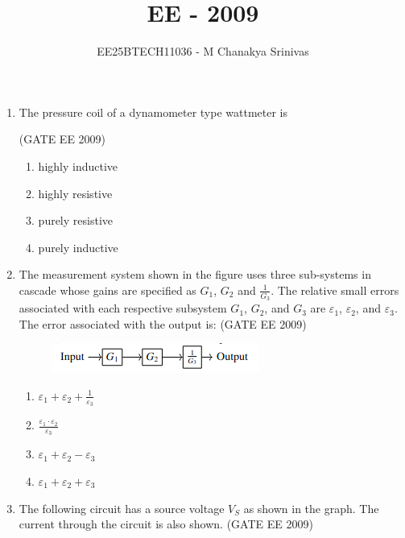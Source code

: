 \documentclass[journal,12pt,onecolumn]{IEEEtran}
\title{\LARGE \textbf{EE - 2009}}
\author{\Large EE25BTECH11036 - M Chanakya Srinivas}
\date{}
\theoremstyle{remark}
\begin{document}
\maketitle
\begin{flushleft}
\begin{enumerate}

\item The pressure coil of a dynamometer type wattmeter is 

\hfill(GATE EE 2009)

\begin{enumerate}
    \item highly inductive  
\item  highly resistive  
\item  purely resistive  
\item purely inductive

\end{enumerate}


\item The measurement system shown in the figure uses three sub-systems in cascade whose gains are specified as $G_1$, $G_2$ and $\frac{1}{G_3}$. The relative small errors associated with each respective subsystem $G_1$, $G_2$, and $G_3$ are $\varepsilon_1$, $\varepsilon_2$, and $\varepsilon_3$. The error associated with the output is: 
\hfill(GATE EE 2009)
\begin{figure}[H]
    \centering
    \includegraphics[width=0.5\columnwidth]{figs/image2.png}
    \caption{}
    \label{fig:placeholder}
\end{figure}

\begin{enumerate}
    \item  $\varepsilon_1 + \varepsilon_2 + \frac{1}{\varepsilon_3}$  
 \item $\frac{\varepsilon_1 \cdot \varepsilon_2}{\varepsilon_3}$  
 \item $\varepsilon_1 + \varepsilon_2 - \varepsilon_3$  
 \item $\varepsilon_1 + \varepsilon_2 + \varepsilon_3$
\end{enumerate}


\item The following circuit has a source voltage $V_S$ as shown in the graph. The current through the circuit is also shown. 
\hfill(GATE EE 2009)


\end{enumerate}
\end{flushleft}
\end{document}

